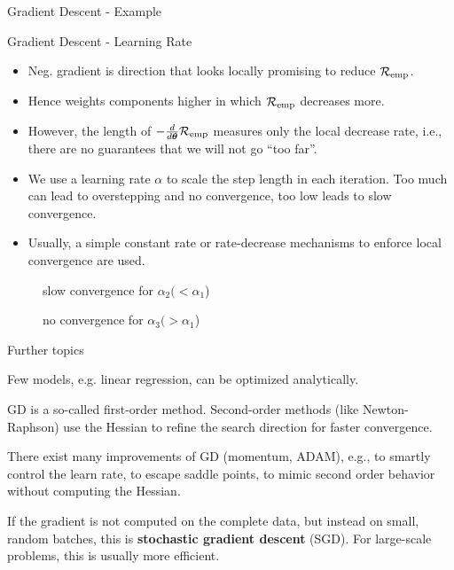 \documentclass[11pt,compress,t,notes=noshow, xcolor=table]{beamer}
\begin{document}
\begin{frame}{Gradient Descent - Example}
\vfill
{}
\end{frame}


\begin{frame}{Gradient Descent - Learning Rate}
\footnotesize
\begin{itemize}
  \item Neg. gradient is direction that looks locally promising to reduce $\mathcal{R}_{\text{emp}}$.
  \item Hence weights components higher in which $\mathcal{R}_{\text{emp}}$ decreases more.
  \item However, the length of $-\frac{d}{d\bm{\theta}}{\mathcal{R}_{\text{emp}}}$ measures only the local decrease rate, i.e., there are no guarantees that we will not go ``too far''.
  \item We use a learning rate $\alpha$ to scale the step length in each iteration. Too much can lead to overstepping and no convergence, too low leads to slow convergence.
  \item Usually, a simple constant rate or rate-decrease mechanisms to enforce local convergence are used.
\end{itemize}
\begin{figure}[!htb]
{
\caption*{\tiny slow convergence for $\alpha_2 (< \alpha_1$)}
}
{
\caption*{\tiny no convergence for $\alpha_3 (> \alpha_1$)}
}
\end{figure}
\end{frame}

\begin{framei}{Further topics}
\item Few models, e.g. linear regression, can be optimized analytically. 
\item GD is a so-called first-order method. Second-order methods (like Newton-Raphson) use the Hessian to refine the search direction for faster convergence.
\item There exist many improvements of GD (momentum, ADAM), e.g., to smartly control the learn rate, to escape saddle points, to mimic second order behavior without computing the Hessian.
\item If the gradient is not computed on the complete data, but instead on small, random batches, this is \textbf{stochastic gradient descent} (SGD). For large-scale problems, this is usually more efficient.
\end{framei}


\endlecture
\end{document}
